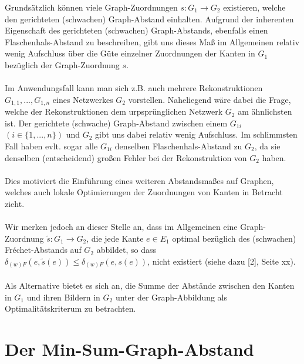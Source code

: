\documentclass[a4paper, 12pt, twoside]{article}
\theoremstyle{Format1} %
\begin{document}
Grundsätzlich können viele Graph-Zuordnungen $s: G_1 \to G_2$ existieren, welche den gerichteten (schwachen) Graph-Abstand einhalten.
Aufgrund der inherenten Eigenschaft des gerichteten (schwachen) Graph-Abstands, ebenfalls einen Flaschenhals-Abstand zu beschreiben, gibt uns dieses Maß im
Allgemeinen relativ wenig Aufschluss über die Güte einzelner Zuordnungen der Kanten in $G_1$ bezüglich der Graph-Zuordnung $s$.
\\
\\
Im Anwendungsfall kann man sich z.B. auch mehrere Rekonstruktionen $G_{1,1}, ..., G_{1,n}$ eines Netzwerkes $G_2$ vorstellen.
Naheliegend wäre dabei die Frage, welche der Rekonstruktionen dem urpsprünglichen Netzwerk $G_2$ am ähnlichsten ist.
Der gerichtete (schwache) Graph-Abstand zwischen einem $G_{1i}$ $(i \in \{1,...,n\})$ und $G_2$ gibt uns dabei relativ wenig Aufschluss.
Im schlimmsten Fall haben evlt. sogar alle $G_{1i}$ denselben Flaschenhals-Abstand zu $G_2$, da sie denselben (entscheidend) großen Fehler bei der Rekonstruktion von $G_2$ haben.
\\
\\
Dies motiviert die Einführung eines weiteren Abstandsmaßes auf Graphen, welches auch lokale Optimierungen der Zuordnungen von Kanten in Betracht zieht.
\\
\\
Wir merken jedoch an dieser Stelle an, dass im Allgemeinen eine Graph-Zuordnung $\tilde{s}: G_1 \to G_2$, die jede Kante $e \in E_1$ optimal bezüglich des (schwachen)
Fréchet-Abstands auf $G_2$ abbildet, so dass $\delta_{(w)F}(e, \tilde{s}(e)) \leq \delta_{(w)F}(e, s(e))$, nicht existiert (siehe dazu [2], Seite xx).
\\
\\
Als Alternative bietet es sich an, die Summe der Abstände zwischen den Kanten in $G_1$ und ihren Bildern in $G_2$ unter der Graph-Abbildung als Optimalitätskriterum zu betrachten.

\section{Der Min-Sum-Graph-Abstand}
\end{document}
